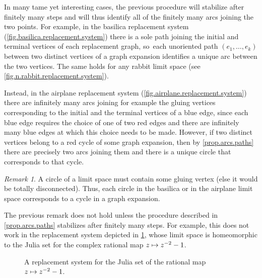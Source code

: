 \documentclass[JEP,XML,SOM,Unicode,NoFloatCountersInSection,published]{cedram}
\newcommand\mto{\mathchoice{\longmapsto}{\mapsto}{\mapsto}{\mapsto}}
\theoremstyle{plain}
\theoremstyle{definition}
\theoremstyle{remark}
\newtheorem{remark}[theorem]{Remark}
\begin{document}
In many tame yet interesting cases, the previous procedure will stabilize after finitely many steps and will thus identify all of the finitely many arcs joining the two points.
For example, in the basilica replacement system (\cref{fig.basilica.replacement.system}) there is a sole path joining the initial and terminal vertices of each replacement graph, so~each unoriented path $(e_1, \dots, e_k)$ between two distinct vertices of a graph expansion identifies a unique arc between the two vertices.
The same holds for any rabbit limit space (see \cref{fig.n.rabbit.replacement.system}).

Instead, in the airplane replacement system (\cref{fig.airplane.replacement.system}) there are infinitely many arcs joining for example the gluing vertices corresponding to the initial and the terminal vertices of a blue edge, since each blue edge requires the choice of one of two red edges and there are infinitely many blue edges at which this choice needs to be made.
However, if two distinct vertices belong to a red cycle of some graph expansion, then by \cref{prop.arcs.paths} there are precisely two arcs joining them and there is a unique circle that corresponds to that cycle.

\begin{remark}
\label{rmk.unique.circles}
A circle of a limit space must contain some gluing vertex (else it would be totally disconnected).
Thus, each circle in the basilica or in the airplane limit space corresponds to a cycle in a graph expansion.
\end{remark}

The previous remark does not hold unless the procedure described in \cref{prop.arcs.paths} stabilizes after finitely many steps.
For example, this does not work in the replacement system depicted in \cref{fig.bubble.bath.replacement.system}, whose limit space is homeomorphic to the Julia set for the complex rational map $z \mto z^{-2}-1$.

\begin{figure}[htb]
\centering
{}
\caption{A replacement system for the Julia set of the rational map $z \mto z^{-2}-1$.}
\label{fig.bubble.bath.replacement.system}
\end{figure}
\end{document}
